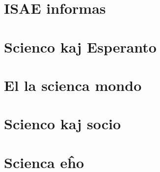 \documentclass[full]{srevuo}
\begin{document}
\part{ISAE informas}

\part{Scienco kaj Esperanto}

\part{El la scienca mondo}

\part{Scienco kaj socio}



\part{Scienca eĥo}

\tableofcontents
\end{document}
